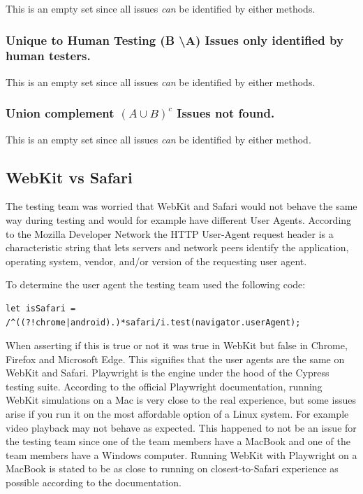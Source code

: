 \documentclass[journal,twocolumn]{IEEEtran}
\begin{document}
This is an empty set since all issues \textit{can} be identified by either methods.

\subsubsection{Unique to Human Testing (B \textbackslash A) Issues only identified by human testers.}

This is an empty set since all issues \textit{can} be identified by either methods.
\subsubsection{Union complement $(A \cup B)^c$ Issues not found.}
This is an empty set since all issues \textit{can} be identified by either method.

\subsection{WebKit vs Safari}
The testing team was worried that WebKit and Safari would not behave the same way during testing and would for example have different User Agents. According to the Mozilla Developer Network the HTTP User-Agent request header is a characteristic string that lets servers and network peers identify the application, operating system, vendor, and/or version of the requesting user agent. %

To determine the user agent the testing team used the following code:

\begin{lstlisting}[caption=Detect Safari Browser, label=code:safari]
let isSafari = /^((?!chrome|android).)*safari/i.test(navigator.userAgent);
\end{lstlisting}

When asserting if this is true or not it was true in WebKit but false in Chrome, Firefox and Microsoft Edge. This signifies that the user agents are the same on WebKit and Safari. Playwright is the engine under the hood of the Cypress testing suite. According to the official Playwright documentation, running WebKit simulations on a Mac is very close to the real experience, but some issues arise if you run it on the most affordable option of a Linux system. For example video playback may not behave as expected. %
This happened to not be an issue for the testing team since one of the team members have a MacBook and one of the team members have a Windows computer. Running WebKit with Playwright on a MacBook is stated to be as close to running on closest-to-Safari experience as possible according to the documentation.
\end{document}
